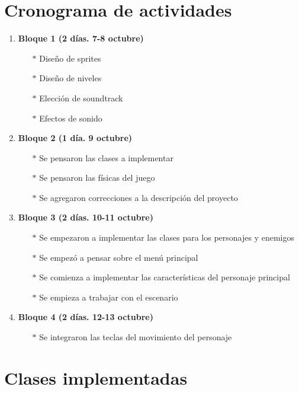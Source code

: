 \documentclass{article}
\begin{document}
\section{Cronograma de actividades}
\begin{enumerate}
    \item \textbf{Bloque 1 (2 días. 7-8 octubre)}
    \begin{enumerate}[a)]
        \item [$*$] Diseño de sprites
        \item [$*$] Diseño de niveles
        \item [$*$] Elección de soundtrack
        \item [$*$] Efectos de sonido
    \end{enumerate}
    \item \textbf{Bloque 2 (1 día. 9 octubre)}
    \begin{enumerate}[a)]
        \item [$*$] Se pensaron las clases a implementar
        \item [$*$] Se pensaron las físicas del juego
        \item [$*$] Se agregaron correcciones a la descripción del proyecto
    \end{enumerate}
    \item \textbf{Bloque 3 (2 días. 10-11 octubre)}
    \begin{enumerate}[a)]
        \item [$*$] Se empezaron a implementar las clases para los personajes y enemigos
        \item [$*$] Se empezó a pensar sobre el menú principal
        \item [$*$] Se comienza a implementar las características del personaje principal
        \item [$*$] Se empieza a trabajar con el escenario
    \end{enumerate}
    \item \textbf{Bloque 4 (2 días. 12-13 octubre)}
    \begin{enumerate}[a)]
        \item [$*$] Se integraron las teclas del movimiento del personaje
    \end{enumerate}
\end{enumerate}
\section{Clases implementadas}
\end{document}
